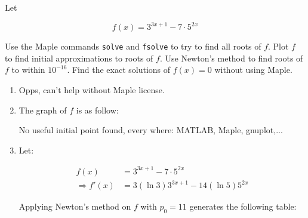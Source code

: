 \documentclass[../../../../Assignments]{subfiles}
\begin{document}
\begin{exercise}\label{exer:2.3.29}
    Let

    \[f(x) = 3^{3x + 1} - 7 \cdot 5^{2x}\]

    \begin{tasks}
        \task Use the Maple commands \lstinline|solve| and \lstinline|fsolve| to
            try to find all roots of \(f\).
        \task Plot \(f\) to find initial approximations to roots of \(f\).
        \task Use Newton's method to find roots of \(f\) to within \(10^{-16}\).
        \task Find the exact solutions of \(f(x) = 0\) without using Maple.
    \end{tasks}
\end{exercise}

\begin{solution}
    \begin{enumerate}
        \item Opps, can't help without Maple license.

        \item The graph of \(f\) is as follow:

            \begin{figure}[H]
                \centering
                \begingroup
                    
                \endgroup
            \end{figure}

            No useful initial point found, every where: MATLAB, Maple, gnuplot,...

        \item Let:

            \begin{align*}
                             f(x) &= 3^{3x + 1} - 7 \cdot 5^{2x} \\
                \Rightarrow f'(x) &= 3 (\ln{3}) 3^{3x + 1} - 14 (\ln{5}) 5^{2x}
            \end{align*}

            Applying Newton's method on \(f\) with \(p_0 = 11\) generates the
            following table:


\end{enumerate}
\end{solution}
\end{document}
